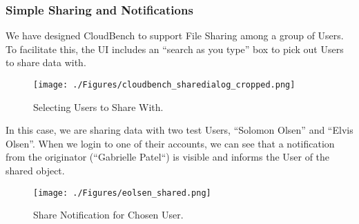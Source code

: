 \subsubsection{Simple Sharing and Notifications}
We have designed CloudBench to support File Sharing among a group of Users. To 
facilitate this, the UI includes an ``search as you type'' box to pick out 
Users to share data with.

\begin{figure}[!thb]
\begin{center}
\leavevmode
\texttt{[image: ./Figures/cloudbench\_sharedialog\_cropped.png]}
\end{center}
\caption{Selecting Users to Share With.}
\label{fig:share_users}
\end{figure}

%  
%  

In this case, we are sharing data with two test Users, ``Solomon Olsen'' and 
``Elvis Olsen''. When we login to one of their accounts, we can see that a 
notification from the originator (``Gabrielle Patel``) is visible and informs 
the User of the shared object.

\begin{figure}[!thb]
\begin{center}
\leavevmode
\texttt{[image: ./Figures/eolsen\_shared.png]}
\end{center}
\caption{Share Notification for Chosen User.}
\label{fig:share_eolsen}
\end{figure}

%  
%  


